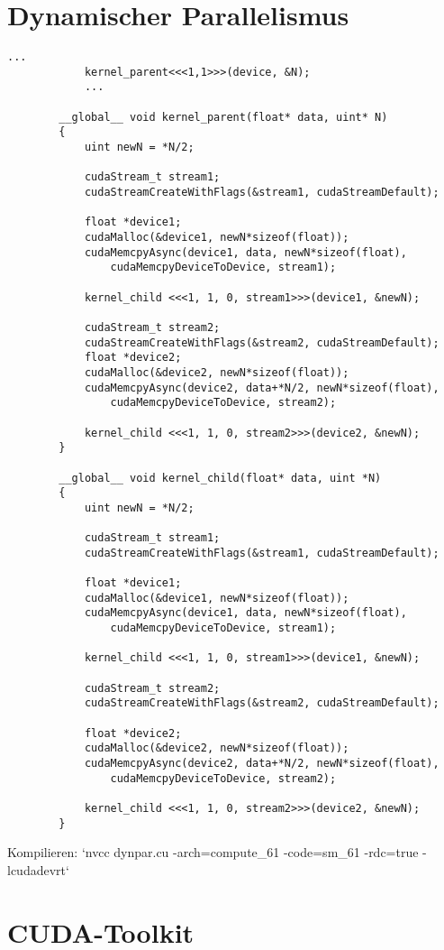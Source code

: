		\section{Dynamischer Parallelismus}\label{dyn}
		\begin{lstlisting}[caption=Dynamischer Parallelismus]
			...
  			kernel_parent<<<1,1>>>(device, &N);
			...
			
		__global__ void kernel_parent(float* data, uint* N)
		{
  			uint newN = *N/2;
  
			cudaStream_t stream1; 
			cudaStreamCreateWithFlags(&stream1, cudaStreamDefault);
  
			float *device1;
			cudaMalloc(&device1, newN*sizeof(float));
			cudaMemcpyAsync(device1, data, newN*sizeof(float), 
				cudaMemcpyDeviceToDevice, stream1);
  
			kernel_child <<<1, 1, 0, stream1>>>(device1, &newN);
  
			cudaStream_t stream2; 
			cudaStreamCreateWithFlags(&stream2, cudaStreamDefault);
			float *device2;
			cudaMalloc(&device2, newN*sizeof(float));
			cudaMemcpyAsync(device2, data+*N/2, newN*sizeof(float), 
				cudaMemcpyDeviceToDevice, stream2);
  
			kernel_child <<<1, 1, 0, stream2>>>(device2, &newN);
		}

		__global__ void kernel_child(float* data, uint *N)
		{
			uint newN = *N/2;
  
			cudaStream_t stream1; 
			cudaStreamCreateWithFlags(&stream1, cudaStreamDefault);
			
			float *device1;
			cudaMalloc(&device1, newN*sizeof(float));
			cudaMemcpyAsync(device1, data, newN*sizeof(float), 
				cudaMemcpyDeviceToDevice, stream1);
  
			kernel_child <<<1, 1, 0, stream1>>>(device1, &newN);
  
			cudaStream_t stream2; 
			cudaStreamCreateWithFlags(&stream2, cudaStreamDefault);
			
			float *device2;
			cudaMalloc(&device2, newN*sizeof(float));
			cudaMemcpyAsync(device2, data+*N/2, newN*sizeof(float), 
				cudaMemcpyDeviceToDevice, stream2);
  
			kernel_child <<<1, 1, 0, stream2>>>(device2, &newN);
		}
		\end{lstlisting}
		
		Kompilieren: \li`nvcc dynpar.cu -arch=compute_61 -code=sm_61 -rdc=true -lcudadevrt`
		
		\section{CUDA-Toolkit}
